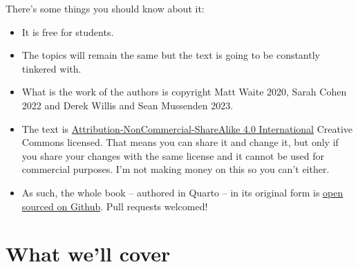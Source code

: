 \documentclass[
  letterpaper,
  DIV=11,
  numbers=noendperiod]{scrreprt}
\providecommand{\tightlist}{%
  \setlength{\itemsep}{0pt}\setlength{\parskip}{0pt}}\usepackage{longtable,booktabs,array}
\begin{document}
There's some things you should know about it:

\begin{itemize}
\tightlist
\item
  It is free for students.
\item
  The topics will remain the same but the text is going to be constantly
  tinkered with.
\item
  What is the work of the authors is copyright Matt Waite 2020, Sarah
  Cohen 2022 and Derek Willis and Sean Mussenden 2023.
\item
  The text is
  \href{https://creativecommons.org/licenses/by-nc-sa/4.0/}{Attribution-NonCommercial-ShareAlike
  4.0 International} Creative Commons licensed. That means you can share
  it and change it, but only if you share your changes with the same
  license and it cannot be used for commercial purposes. I'm not making
  money on this so you can't either.\\
\item
  As such, the whole book -- authored in Quarto -- in its original form
  is \href{https://github.com/dwillis/datajournalismbook-maryland}{open
  sourced on Github}. Pull requests welcomed!
\end{itemize}

\hypertarget{what-well-cover}{%
\section{What we'll cover}\label{what-well-cover}}
\end{document}

